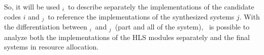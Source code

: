         So, it will be used \A$_{i}$\ to describe separately the implementations of the candidate codes $ i $ and \Ss$_{j}$\ to reference the implementations of the synthesized systems $ j $.
        With the differentiation between \A$_{i}$\ and \Ss$_{j}$\ (part and all of the system), \ is possible to analyze both the implementations of the HLS modules separately and the final systems in resource allocation.
        
        
